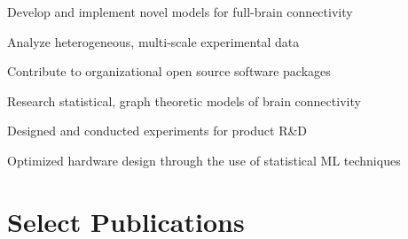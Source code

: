 \documentclass[]{deedy-resume-openfont}
\begin{document}
\begin{minipage}[t]{0.63\textwidth}
\vspace{\topsep}
\begin{tightemize}
\item {Develop and implement novel models for full-brain connectivity}
\item {Analyze heterogeneous, multi-scale experimental data}
\item {Contribute to organizational open source software packages}
\item {Research statistical, graph theoretic models of brain connectivity}
\end{tightemize}
\sectionsep

\begin{tightemize}
\item {Designed and conducted experiments for product R\&D}
\item {Optimized hardware design through the use of statistical ML techniques}
\end{tightemize}
\sectionsep


%
%



\section{Select Publications}
\renewcommand\refname{\vspace{-10mm}} %


\nocite{*}

\end{minipage}
\end{document}
